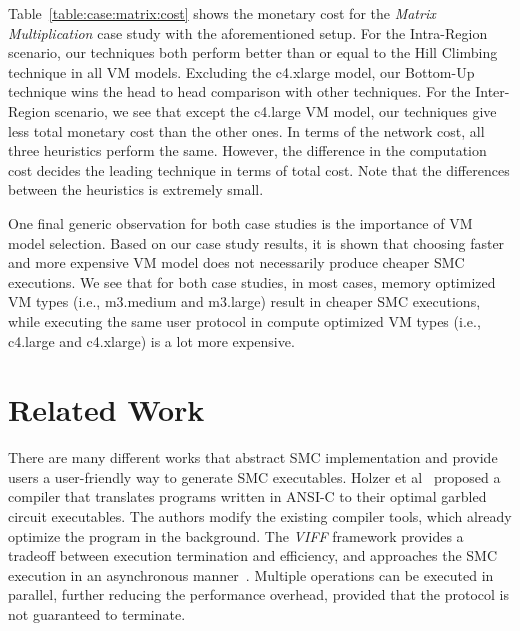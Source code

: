 \documentclass{llncs}
\begin{document}
\vspace{-1.0cm}
Table~\ref{table:case:matrix:cost} shows the monetary cost for the \emph{Matrix Multiplication} case study with the aforementioned setup. For the Intra-Region scenario, our techniques both perform better than or equal to the Hill Climbing technique in all VM models. Excluding the c4.xlarge model, our Bottom-Up technique wins the head to head comparison with other techniques. For the Inter-Region scenario, we see that except the c4.large VM model, our techniques give less total monetary cost than the other ones. In terms of the network cost, all three heuristics perform the same. However, the difference in the computation cost decides the leading technique in terms of total cost. Note that the differences between the heuristics is extremely small.

One final generic observation for both case studies is the importance of VM model selection. Based on our case study results, it is shown that choosing faster and more expensive VM model does not necessarily produce cheaper SMC executions. We see that for both case studies, in most cases, memory optimized VM types (i.e., m3.medium and m3.large) result in cheaper SMC executions, while executing the same user protocol in compute optimized VM types (i.e., c4.large and c4.xlarge) is a lot more expensive. 

\vspace{-0.4cm}
\section{Related Work}
\label{sec:related}

\vspace{-0.409cm}
There are many different works that abstract SMC implementation and provide users a user-friendly way to generate SMC executables. Holzer et al~\cite{cite:holzer2012secure} proposed a compiler that translates programs written in ANSI-C to their optimal garbled circuit executables. The authors modify the existing compiler tools, which already optimize the program in the background. The \emph{VIFF} framework provides a tradeoff between execution termination and efficiency, and approaches the SMC execution in an asynchronous manner~\cite{cite:damgaard2009asynchronous}. Multiple operations can be executed in parallel, further reducing the performance overhead, provided that the protocol is not guaranteed to terminate. 
\end{document}
